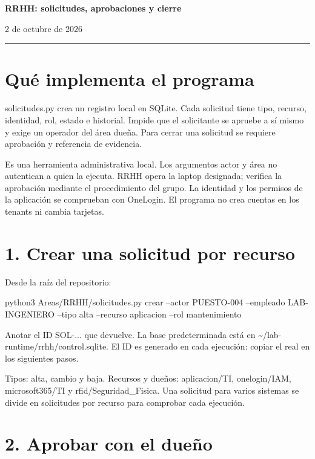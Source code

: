 \documentclass[12pt,a4paper]{article}
\begin{document}
{\LARGE\bfseries RRHH: solicitudes, aprobaciones y cierre\par}\vspace{6pt}
2 de octubre de 2026\par\hrule\vspace{10pt}
\section*{Qué implementa el programa}
\textnormal{solicitudes.py} crea un registro local en SQLite. Cada solicitud tiene tipo, recurso, identidad, rol, estado e historial. Impide que el solicitante se apruebe a sí mismo y exige un operador del área dueña. Para cerrar una solicitud se requiere aprobación y referencia de evidencia.\par
Es una herramienta administrativa local. Los argumentos actor y área no autentican a quien la ejecuta. RRHH opera la laptop designada; verifica la aprobación mediante el procedimiento del grupo. La identidad y los permisos de la aplicación se comprueban con OneLogin. El programa no crea cuentas en los tenants ni cambia tarjetas.\par
{}\section*{1. Crear una solicitud por recurso}
Desde la raíz del repositorio:\par
{}
\begin{Comandos}
python3 Areas/RRHH/solicitudes.py crear --actor PUESTO-004 --empleado LAB-INGENIERO --tipo alta --recurso aplicacion --rol mantenimiento
\end{Comandos}
Anotar el ID \textnormal{SOL-...} que devuelve. La base predeterminada está en \textnormal{\textasciitilde{}/\allowbreak{}lab-runtime/\allowbreak{}rrhh/\allowbreak{}control.sqlite}. El ID es generado en cada ejecución: copiar el real en los siguientes pasos.\par
Tipos: alta, cambio y baja. Recursos y dueños: aplicacion/TI, onelogin/IAM, microsoft365/TI y rfid/Seguridad\_Fisica. Una solicitud para varios sistemas se divide en solicitudes por recurso para comprobar cada ejecución.\par
{}\section*{2. Aprobar con el dueño}
\end{document}
